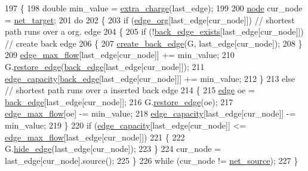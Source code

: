 \begin{DoxyCode}
197 \{
198     \textcolor{keywordtype}{double} min\_value = \mbox{\hyperlink{classmaxflow__ff_a410a7c5b9b75225ec0a48402dc2f6555}{extra\_charge}}(last\_edge);
199 
200     \mbox{\hyperlink{classnode}{node}} cur\_node = \mbox{\hyperlink{classmaxflow__ff_a94d5db73364cf5824ec3d3d530b57319}{net\_target}};
201     \textcolor{keywordflow}{do}
202     \{
203     \textcolor{keywordflow}{if} (\mbox{\hyperlink{classmaxflow__ff_aa9fd46b8da1a67678b132a17e7a41c91}{edge\_org}}[last\_edge[cur\_node]])  \textcolor{comment}{// shortest path runs over a org. edge}
204     \{
205         \textcolor{keywordflow}{if} (!\mbox{\hyperlink{classmaxflow__ff_a686006593b17dfd3ad9a5e02b1ad9e92}{back\_edge\_exists}}[last\_edge[cur\_node]]) \textcolor{comment}{// create back edge}
206         \{
207         \mbox{\hyperlink{classmaxflow__ff_aea04831f46fb86990c9ba21fb19d0382}{create\_back\_edge}}(G, last\_edge[cur\_node]);
208         \}
209         \mbox{\hyperlink{classmaxflow__ff_a669f36f1fae2dd0f6cfc0172e3ae0e8f}{edge\_max\_flow}}[last\_edge[cur\_node]] += min\_value;
210         G.\mbox{\hyperlink{classgraph_a2e5426682a0897b9f9104b019970bedc}{restore\_edge}}(\mbox{\hyperlink{classmaxflow__ff_abceef8f9ee5acf7a992301de6d0c80de}{back\_edge}}[last\_edge[cur\_node]]);
211         \mbox{\hyperlink{classmaxflow__ff_a5b38943e093c77a57eb70f1a4190b8a6}{edge\_capacity}}[\mbox{\hyperlink{classmaxflow__ff_abceef8f9ee5acf7a992301de6d0c80de}{back\_edge}}[last\_edge[cur\_node]]] += min\_value;
212     \}
213     \textcolor{keywordflow}{else}    \textcolor{comment}{// shortest path runs over a inserted back edge}
214     \{
215         \mbox{\hyperlink{classedge}{edge}} oe = \mbox{\hyperlink{classmaxflow__ff_abceef8f9ee5acf7a992301de6d0c80de}{back\_edge}}[last\_edge[cur\_node]];
216         G.\mbox{\hyperlink{classgraph_a2e5426682a0897b9f9104b019970bedc}{restore\_edge}}(oe);
217         \mbox{\hyperlink{classmaxflow__ff_a669f36f1fae2dd0f6cfc0172e3ae0e8f}{edge\_max\_flow}}[oe] -= min\_value;
218         \mbox{\hyperlink{classmaxflow__ff_a5b38943e093c77a57eb70f1a4190b8a6}{edge\_capacity}}[last\_edge[cur\_node]] -= min\_value;
219     \}
220     \textcolor{keywordflow}{if} (\mbox{\hyperlink{classmaxflow__ff_a5b38943e093c77a57eb70f1a4190b8a6}{edge\_capacity}}[last\_edge[cur\_node]] <= \mbox{\hyperlink{classmaxflow__ff_a669f36f1fae2dd0f6cfc0172e3ae0e8f}{edge\_max\_flow}}[last\_edge[cur\_node]])
221     \{
222         G.\mbox{\hyperlink{classgraph_ab2f8520bcac080d73c55228fecc61825}{hide\_edge}}(last\_edge[cur\_node]);
223     \}
224     cur\_node = last\_edge[cur\_node].source();
225     \}
226     \textcolor{keywordflow}{while} (cur\_node != \mbox{\hyperlink{classmaxflow__ff_a2e4cc02ce8c9d929f2896525c686d6c1}{net\_source}});
227 \}
\end{DoxyCode}
